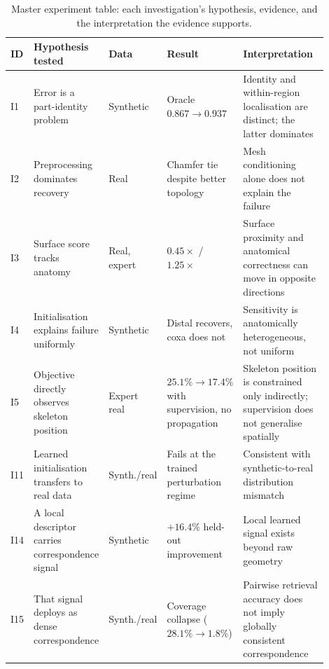 \begin{table}[!htb]
\centering
\caption{Master experiment table: each investigation's hypothesis, evidence,
and the interpretation the evidence supports.}
\small
\begin{tabular}{@{}p{0.05\linewidth}p{0.23\linewidth}p{0.14\linewidth}p{0.18\linewidth}p{0.30\linewidth}@{}}
\toprule
\textbf{ID} & \textbf{Hypothesis tested} & \textbf{Data} & \textbf{Result} & \textbf{Interpretation} \\
\midrule
I1 & Error is a part-identity problem & Synthetic & Oracle $0.867\to0.937$ &
  Identity and within-region localisation are distinct; the latter dominates \\
I2 & Preprocessing dominates recovery & Real & Chamfer tie despite better
  topology & Mesh conditioning alone does not explain the failure \\
I3 & Surface score tracks anatomy & Real, expert & $0.45\times$ / $1.25\times$
  & Surface proximity and anatomical correctness can move in opposite
  directions \\
I4 & Initialisation explains failure uniformly & Synthetic & Distal
  recovers, coxa does not & Sensitivity is anatomically heterogeneous, not
  uniform \\
I5 & Objective directly observes skeleton position & Expert real &
  $25.1\%\to17.4\%$ with supervision, no propagation & Skeleton position is
  constrained only indirectly; supervision does not generalise spatially \\
I11 & Learned initialisation transfers to real data & Synth./real & Fails at
  the trained perturbation regime & Consistent with synthetic-to-real
  distribution mismatch \\
I14 & A local descriptor carries correspondence signal & Synthetic &
  $+16.4\%$ held-out improvement & Local learned signal exists beyond raw
  geometry \\
I15 & That signal deploys as dense correspondence & Synth./real & Coverage
  collapse ($28.1\%\to1.8\%$) & Pairwise retrieval accuracy does not imply
  globally consistent correspondence \\
\bottomrule
\end{tabular}
\end{table}

